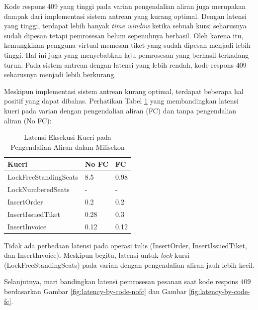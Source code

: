 Kode respons 409 yang tinggi pada varian pengendalian aliran juga merupakan dampak dari implementasi sistem antrean yang kurang optimal. Dengan latensi yang tinggi, terdapat lebih banyak \textit{time window} ketika sebuah kursi seharusnya sudah dipesan tetapi pemrosesan belum sepenuhnya berhasil. Oleh karena itu, kemungkinan pengguna virtual memesan tiket yang sudah dipesan menjadi lebih tinggi. Hal ini juga yang menyebabkan laju pemrosesan yang berhasil terkadang turun. Pada sistem antrean dengan latensi yang lebih rendah, kode respons 409 seharusnya menjadi lebih berkurang.

Meskipun implementasi sistem antrean kurang optimal, terdapat beberapa hal positif yang dapat dibahas. Perhatikan Tabel \ref{table:latensi-kueri-fc-nofc} yang membandingkan latensi kueri pada varian dengan pengendalian aliran (FC) dan tanpa pengendalian aliran (No FC):

\begin{table}[H]
    \centering
    \caption{Latensi Eksekusi Kueri pada Pengendalian Aliran dalam Milisekon}
    \label{table:latensi-kueri-fc-nofc}
    \begin{tabular}{|l|l|l|}
        \hline
        \textbf{Kueri}        & \textbf{No FC} & \textbf{FC} \\
        \hline
        LockFreeStandingSeats & 8.5            & 0.98        \\
        \hline
        LockNumberedSeats     & -              & -           \\
        \hline
        InsertOrder           & 0.2            & 0.2         \\
        \hline
        InsertIssuedTiket     & 0.28           & 0.3         \\
        \hline
        InsertInvoice         & 0.12           & 0.12        \\
        \hline
    \end{tabular}
\end{table}

Tidak ada perbedaan latensi pada operasi tulis (InsertOrder, InsertIssuedTiket, dan InsertInvoice). Meskipun begitu, latensi untuk \textit{lock} kursi (LockFreeStandingSeats) pada varian dengan pengendalian aliran jauh lebih kecil.

Selanjutnya, mari bandingkan latensi pemrosesan pesanan saat kode respons 409 berdasarkan Gambar \ref{fig:latency-by-code-nofc} dan Gambar \ref{fig:latency-by-code-fc}.

